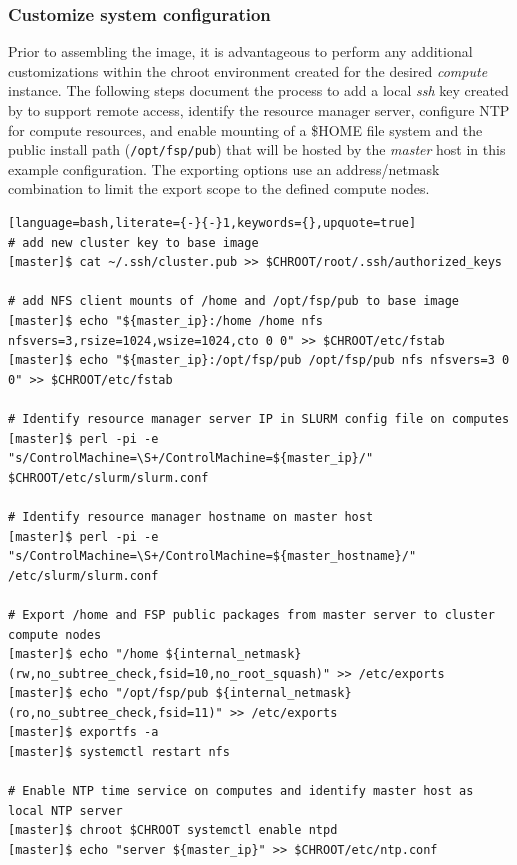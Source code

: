 \documentclass[letterpaper]{article}
\begin{document}

\subsubsection{Customize system configuration} \label{sec:master_customization}

Prior to assembling the image, it is advantageous to perform any additional
customizations within the chroot environment created for the desired {\em
  compute} instance. The following steps document the process to add a local
{\em ssh} key created by \Warewulf{} to support remote access, identify the
resource manager server, configure NTP for compute resources, and enable \NFS{}
mounting of a \$HOME file system and the public \FSP{} install path
(\texttt{/opt/fsp/pub}) that will be hosted by the {\em master} host in this
example configuration.  The \NFS{} exporting options use an address/netmask
combination to limit the export scope to the defined compute nodes.

\begin{lstlisting}[language=bash,literate={-}{-}1,keywords={},upquote=true]
# add new cluster key to base image
[master]$ cat ~/.ssh/cluster.pub >> $CHROOT/root/.ssh/authorized_keys

# add NFS client mounts of /home and /opt/fsp/pub to base image
[master]$ echo "${master_ip}:/home /home nfs nfsvers=3,rsize=1024,wsize=1024,cto 0 0" >> $CHROOT/etc/fstab
[master]$ echo "${master_ip}:/opt/fsp/pub /opt/fsp/pub nfs nfsvers=3 0 0" >> $CHROOT/etc/fstab

# Identify resource manager server IP in SLURM config file on computes
[master]$ perl -pi -e "s/ControlMachine=\S+/ControlMachine=${master_ip}/" $CHROOT/etc/slurm/slurm.conf

# Identify resource manager hostname on master host
[master]$ perl -pi -e "s/ControlMachine=\S+/ControlMachine=${master_hostname}/" /etc/slurm/slurm.conf

# Export /home and FSP public packages from master server to cluster compute nodes
[master]$ echo "/home ${internal_netmask}(rw,no_subtree_check,fsid=10,no_root_squash)" >> /etc/exports
[master]$ echo "/opt/fsp/pub ${internal_netmask}(ro,no_subtree_check,fsid=11)" >> /etc/exports
[master]$ exportfs -a
[master]$ systemctl restart nfs

# Enable NTP time service on computes and identify master host as local NTP server
[master]$ chroot $CHROOT systemctl enable ntpd
[master]$ echo "server ${master_ip}" >> $CHROOT/etc/ntp.conf
\end{lstlisting}
\end{document}
